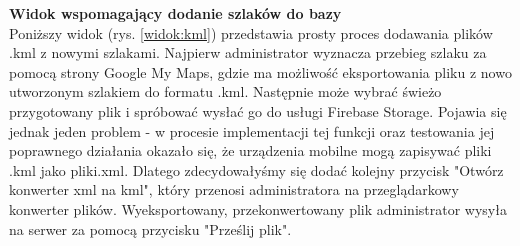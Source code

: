 \textbf{Widok wspomagający dodanie szlaków do bazy} \\ 
Poniższy widok (rys. \ref{widok:kml}) przedstawia prosty proces dodawania plików .kml z nowymi szlakami. Najpierw administrator wyznacza przebieg szlaku za pomocą strony Google My Maps, gdzie ma możliwość eksportowania pliku z nowo utworzonym szlakiem do formatu .kml. Następnie może wybrać świeżo przygotowany plik i spróbować wysłać go do usługi Firebase Storage. Pojawia się jednak jeden problem - w procesie implementacji tej funkcji oraz testowania jej poprawnego działania okazało się, że urządzenia mobilne mogą zapisywać pliki .kml jako pliki.xml. Dlatego zdecydowałyśmy się dodać kolejny przycisk "Otwórz konwerter xml na kml", który przenosi administratora na przeglądarkowy konwerter plików. Wyeksportowany, przekonwertowany plik administrator wysyła na serwer za pomocą przycisku "Prześlij plik".
